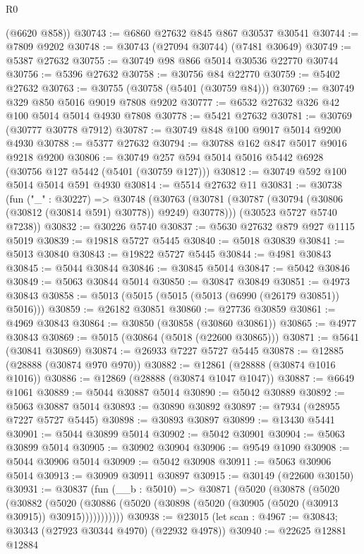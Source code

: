 \begin{lexlean}{R0}
\begin{coremodule}
      (@6620 @858))
@30743 := @6860 @27632 @845 @867 @30537 @30541
@30744 := @7809 @9202
@30748 := @30743 (@27094 @30744) (@7481 @30649)
@30749 := @5387 @27632
@30755 := @30749 @98 @866 @5014 @30536 @22770 @30744
@30756 := @5396 @27632
@30758 := @30756 @84 @22770
@30759 := @5402 @27632
@30763 := @30755 (@30758 (@5401 (@30759 @84)))
@30769 := @30749 @329 @850 @5016 @9019 @7808 @9202
@30777 := @6532 @27632 @326 @42 @100 @5014 @5014 @4930 @7808
@30778 := @5421 @27632
@30781 := @30769 (@30777 @30778 @7912)
@30787 := @30749 @848 @100 @9017 @5014 @9200 @4930
@30788 := @5377 @27632
@30794 := @30788 @162 @847 @5017 @9016 @9218 @9200
@30806 := @30749 @257 @594 @5014 @5016 @5442 @6928 (@30756 @127 @5442 (@5401 (@30759 @127)))
@30812 := @30749 @592 @100 @5014 @5014 @591 @4930
@30814 := @5514 @27632 @11
@30831 := @30738
    (fun ("_" : @30227) =>
    @30748
      (@30763 (@30781 (@30787 (@30794 (@30806 (@30812 (@30814 @591) @30778)) @9249) @30778)))
      (@30523 @5727 @5740 @7238))
@30832 := @30226 @5740
@30837 := @5630 @27632 @879 @927 @1115 @5019
@30839 := @19818 @5727 @5445
@30840 := @5018 @30839
@30841 := @5013 @30840
@30843 := @19822 @5727 @5445
@30844 := @4981 @30843
@30845 := @5044 @30844
@30846 := @30845 @5014
@30847 := @5042 @30846
@30849 := @5063 @30844 @5014
@30850 := @30847 @30849
@30851 := @4973 @30843
@30858 := @5013 (@5015 (@5015 (@5013 (@6990 (@26179 @30851)) @5016)))
@30859 := @26182 @30851
@30860 := @27736 @30859
@30861 := @4969 @30843
@30864 := @30850 (@30858 (@30860 @30861))
@30865 := @4977 @30843
@30869 := @5015 (@30864 (@5018 (@22600 @30865)))
@30871 := @5641 (@30841 @30869)
@30874 := @26933 @7227 @5727 @5445
@30878 := @12885 (@28888 (@30874 @970 @970))
@30882 := @12861 (@28888 (@30874 @1016 @1016))
@30886 := @12869 (@28888 (@30874 @1047 @1047))
@30887 := @6649 @1061
@30889 := @5044 @30887 @5014
@30890 := @5042 @30889
@30892 := @5063 @30887 @5014
@30893 := @30890 @30892
@30897 := @7934 (@28955 @7227 @5727 @5445)
@30898 := @30893 @30897
@30899 := @13430 @5441
@30901 := @5044 @30899 @5014
@30902 := @5042 @30901
@30904 := @5063 @30899 @5014
@30905 := @30902 @30904
@30906 := @9549 @1090
@30908 := @5044 @30906 @5014
@30909 := @5042 @30908
@30911 := @5063 @30906 @5014
@30913 := @30909 @30911 @30897
@30915 := @30149 (@22600 @30150)
@30931 := @30837
    (fun (__b : @5010) =>
    @30871
      (@5020
        (@30878
          (@5020
            (@30882
              (@5020 (@30886 (@5020 (@30898 (@5020 (@30905 (@5020 (@30913 @30915)) @30915)))))))))))
@30938 := @23015 (let scan : @4967 := @30843; @30343 (@27923 @30344 @4970) (@22932 @4978))
@30940 := @22625 @12881 @12884

\end{coremodule}
\end{lexlean}
